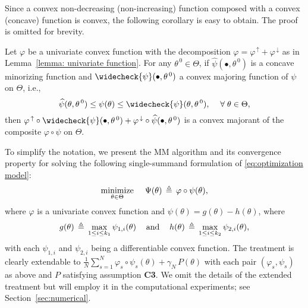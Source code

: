 \documentclass{siamart}
\newcommand{\epc}{\hspace{1pc}}
\newcommand{\wh}{\widehat}
\newcommand{\gap}{\vspace{0.0in}}
\newtheorem{example}{Example}
\begin{document}


Since a convex non-decreasing (non-increasing) function composed with a convex (concave) function is convex,
the following corollary is easy to obtain.  The proof is omitted for brevity.


\begin{corollary}\label{corollary: composite majorant}
 Let $\varphi$ be a univariate convex function with the
decomposition $\varphi = \varphi^{\, \uparrow} + \varphi^{\, \downarrow}$ as in Lemma~\ref{lemma: univariate function}.
For any $\theta^{\, 0} \in \Theta$,
if $\wh{\psi}(\bullet,\theta^{\, 0})$ is a concave minorizing function and $\widecheck{\psi}(\bullet,\theta^{\, 0})$ a convex
majoring function of $\psi$ on $\Theta$, i.e.,
\[
\wh{\psi}(\theta,\theta^{\, 0})\leq \psi(\theta) \leq \widecheck{\psi}(\theta,\theta^{\, 0}),\epc \forall\;\theta\in \Theta,
\]
then
$\varphi^{\, \uparrow} \circ \widecheck{\psi}(\bullet,\theta^{\, 0}) + \varphi^{\, \downarrow} \circ \wh{\psi}(\bullet,\theta^{\, 0})$
is a convex majorant of the composite $\varphi\circ \psi$ on $\Theta$.
\end{corollary}


\gap
To simplify the notation, we present the MM algorithm and its convergence property for solving the following
single-summand formulation of \eqref{eq:optimization model}:
\begin{equation}\label{eq:optimization model2}
\operatornamewithlimits{\mbox{minimize}}_{\theta \in \Theta}\epc  \Psi(\theta)\,\triangleq \, \varphi \circ \psi(\theta),
\end{equation}
where $\varphi$ is a univariate convex function and $\psi(\theta) = g(\theta) - h(\theta)$, where
\[
g(\theta) \, \triangleq \, \max_{1\leq i\leq k_1} \psi_{1,i}(\theta) \epc \mbox{and} \epc
h(\theta) \, \triangleq \, \max_{1\leq i\leq k_2} \psi_{2,i}(\theta), %
\]
with each $\psi_{1,i}$ and $\psi_{2,i}$ being a differentiable convex function.
The treatment is clearly extendable to $\displaystyle\frac{1}{N}\sum_{s=1}^N \varphi_s \circ \psi_s(\theta) + \gamma_N \,P(\theta)$
with each pair $(\varphi_s, \psi_s)$ as above and $P$ satisfying assumption {\bf C3}.  We omit the details of the extended treatment
but will employ it in the computational experiments; see Section~\ref{sec:numerical}.
\end{document}
